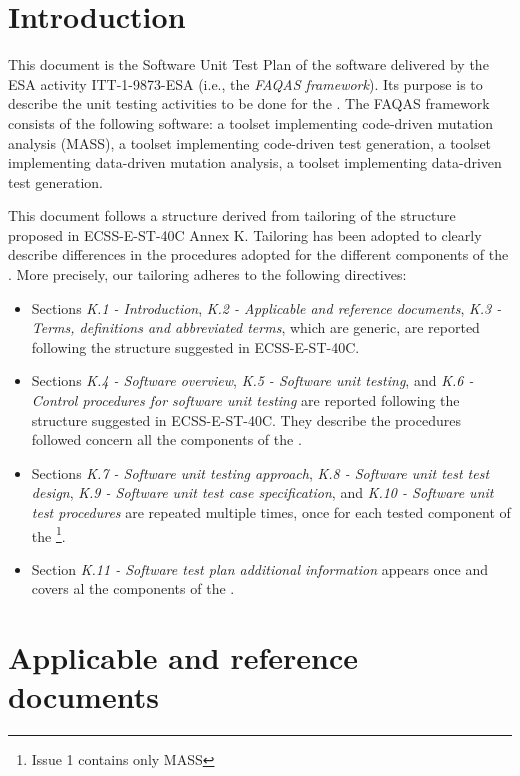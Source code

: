 
\chapter{Introduction}

This document is the Software Unit Test Plan of the software delivered by the ESA activity ITT-1-9873-ESA (i.e., the \emph{FAQAS framework}). Its purpose is to describe the unit testing activities to be done for the \FAQAS.
The FAQAS framework consists of the following software: a toolset  implementing code-driven mutation analysis (MASS), a toolset implementing code-driven test generation, a toolset implementing data-driven mutation analysis, a toolset implementing data-driven test generation.

This document follows a structure derived from tailoring of the structure proposed in ECSS-E-ST-40C Annex K. Tailoring has been adopted to clearly describe differences in the procedures adopted for the different components of the \FAQAS. More precisely, our tailoring adheres to the following directives:

\begin{itemize}
\item Sections 
\emph{K.1 - Introduction}, 
\emph{K.2 - Applicable and reference documents}, 
\emph{K.3 - Terms, definitions and abbreviated terms}, which are generic, are reported following the structure suggested in ECSS-E-ST-40C. 

\item Sections \emph{K.4 - Software overview}, \emph{K.5 - Software unit testing}, 
 and \emph{K.6 - Control procedures for software unit testing} are reported following the structure suggested in ECSS-E-ST-40C. They describe the procedures followed concern all the components of the \FAQAS.
 
\item Sections \emph{K.7 - Software unit testing approach}, 
\emph{K.8 - Software unit test test design},
 \emph{K.9 - Software unit test case specification},
 and \emph{K.10 - Software unit test procedures} are repeated multiple times, once for each tested component of the \FAQAS\footnote{Issue 1 contains only MASS}. 
 
\item Section \emph{K.11 - Software test plan additional information} appears once and covers al the components of the \FAQAS.
\end{itemize}
 
\chapter{Applicable and reference documents}

